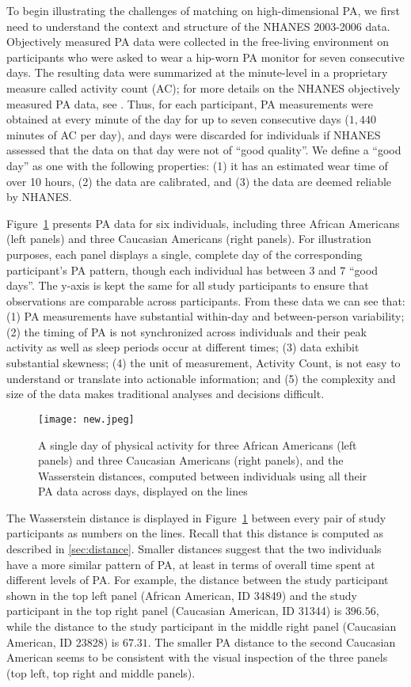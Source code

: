To begin illustrating the challenges of matching on high-dimensional PA, we first need to understand the context and structure of the NHANES 2003-2006 data. Objectively measured PA data were collected in the free-living environment on participants who were asked to wear a hip-worn PA monitor for seven consecutive days. The resulting data were summarized at the minute-level in a proprietary measure called activity count (AC); for more details on the NHANES objectively measured PA data, see \cite{leroux_organizing_2019}. Thus, for each participant, PA measurements were obtained at every minute of the day for up to seven consecutive days ($1{,}440$ minutes of AC per day), and days were discarded for individuals if NHANES assessed that the data on that day were not of ``good quality''. We define a ``good day'' as one with the following properties: (1) it has an estimated wear time of over 10 hours, (2) the data are calibrated, and (3) the data are deemed reliable by NHANES. 

Figure~\ref{fig:mesh1} presents PA data for six individuals, including three African Americans (left panels) and three Caucasian Americans (right panels). For illustration purposes, each panel displays a single, complete day of the corresponding participant's PA pattern, though each individual has between $3$ and $7$ ``good days''. The y-axis is kept the same for all study participants to ensure that observations are comparable across participants. From these data we can see that: (1) PA measurements have substantial within-day and between-person variability; (2) the timing of PA is not synchronized across individuals and their peak activity as well as sleep periods occur at different times; (3) data exhibit substantial skewness; (4) the unit of measurement, Activity Count, is not easy to understand or translate into actionable information; and (5) the complexity and size of the data makes traditional analyses and decisions difficult.

\begin{figure}[H]
    \centering
    \texttt{[image: new.jpeg]}
    \caption{A single day of physical activity for three African Americans (left panels) and three Caucasian Americans (right panels), and the Wasserstein distances, computed between individuals using all their PA data across days, displayed on the lines}
    \label{fig:mesh1}
\end{figure}

The Wasserstein distance is displayed in Figure~\ref{fig:mesh1} between every pair of study participants as numbers on the lines. Recall that this distance is computed as described in \ref{sec:distance}. Smaller distances suggest that the two individuals have a more similar pattern of PA, at least in terms of overall time spent at different levels of PA. For example, the distance between the study participant shown in the top left panel (African American, ID 34849) and the study participant in the top right panel (Caucasian American, ID 31344) is $396.56$, while the distance to the study participant in the middle right panel (Caucasian American, ID 23828) is $67.31$. The smaller PA distance to the second Caucasian American seems to be consistent with the visual inspection of the three panels (top left, top right and middle panels). 

